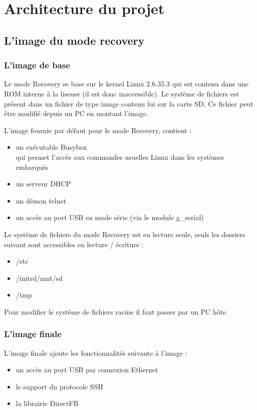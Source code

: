 \chapter{Architecture du projet}

\section{L'image du mode recovery}

\subsection{L'image de base}
Le mode Recovery se base sur le kernel Linux 2.6.35.3 qui est contenu dans une ROM interne à la liseuse (il est donc inaccessible). Le système de fichiers est présent dans un fichier de type image contenu lui sur la carte SD. Ce fichier peut être modifié depuis un PC en montant l'image.

L'image fournie par défaut pour le mode Recovery, contient : 
\begin{itemize}
	\item un exécutable Busybox \\
		qui permet l'accès aux commandes usuelles Linux dans les systèmes embarqués
	\item un serveur DHCP
	\item un démon telnet
	\item un accès au port USB en mode série (via le module g_serial)
\end{itemize}


Le système de fichiers du mode Recovery est en lecture seule, seuls les dossiers suivant sont accessibles en lecture / écriture : 
\begin{itemize}
	\item /etc
	\item /initrd/mnt/sd
	\item /tmp
\end{itemize}

Pour modifier le système de fichiers racine il faut passer par un PC hôte.

\subsection{L'image finale}

L'image finale ajoute les fonctionnalités suivante à l'image : 
	\begin{itemize}
		\item un accès au port USB par connexion Ethernet
		\item le support du protocole SSH
		\item la librairie DirectFB
	\end{itemize}

